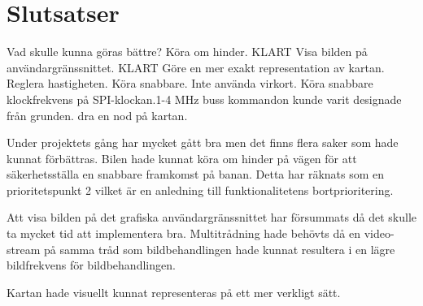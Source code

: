 \documentclass[tekniskrapport/tech.tex]{subfiles}
\begin{document}
\section{Slutsatser}
Vad skulle kunna göras bättre?
Köra om hinder.   KLART
Visa bilden på användargränssnittet. KLART
Göre en mer exakt representation av kartan.
Reglera hastigheten. Köra snabbare.
Inte använda virkort.
Köra snabbare klockfrekvens på SPI-klockan.1-4 MHz
buss kommandon kunde varit designade från grunden.
dra en nod på kartan.

Under projektets gång har mycket gått bra men det finns flera saker som hade
kunnat förbättras. Bilen hade kunnat köra om hinder på vägen för att
säkerhetsställa en snabbare framkomst på banan. Detta har räknats som en
prioritetspunkt 2 vilket är en anledning till funktionalitetens
bortprioritering.

Att visa bilden på det grafiska användargränssnittet har försummats då det
skulle ta mycket tid att implementera bra. Multitrådning hade behövts då en
video-stream på samma tråd som bildbehandlingen hade kunnat resultera i en
lägre bildfrekvens för bildbehandlingen.

Kartan hade visuellt kunnat representeras på ett mer verkligt sätt. 
\end{document}
